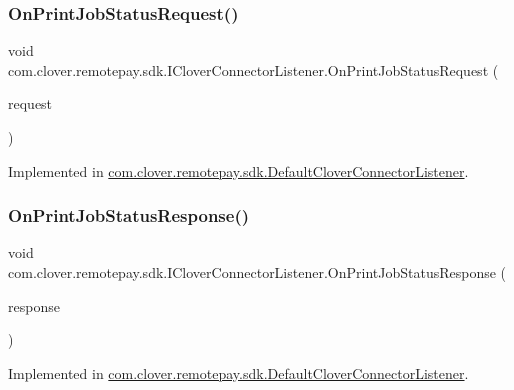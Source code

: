 \subsubsection{\texorpdfstring{On\+Print\+Job\+Status\+Request()}{OnPrintJobStatusRequest()}}
{\footnotesize\ttfamily void com.\+clover.\+remotepay.\+sdk.\+I\+Clover\+Connector\+Listener.\+On\+Print\+Job\+Status\+Request (\begin{DoxyParamCaption}\item[{\hyperlink{classcom_1_1clover_1_1remotepay_1_1sdk_1_1_print_job_status_request}{Print\+Job\+Status\+Request}}]{request }\end{DoxyParamCaption})}



Implemented in \hyperlink{classcom_1_1clover_1_1remotepay_1_1sdk_1_1_default_clover_connector_listener_a739a8523907057a33f0babacef2b1336}{com.\+clover.\+remotepay.\+sdk.\+Default\+Clover\+Connector\+Listener}.

\mbox{\label{interfacecom_1_1clover_1_1remotepay_1_1sdk_1_1_i_clover_connector_listener_a37d3d2607d2a424980bf22c59bedcf9b}} 
\subsubsection{\texorpdfstring{On\+Print\+Job\+Status\+Response()}{OnPrintJobStatusResponse()}}
{\footnotesize\ttfamily void com.\+clover.\+remotepay.\+sdk.\+I\+Clover\+Connector\+Listener.\+On\+Print\+Job\+Status\+Response (\begin{DoxyParamCaption}\item[{\hyperlink{classcom_1_1clover_1_1remotepay_1_1sdk_1_1_print_job_status_response}{Print\+Job\+Status\+Response}}]{response }\end{DoxyParamCaption})}



Implemented in \hyperlink{classcom_1_1clover_1_1remotepay_1_1sdk_1_1_default_clover_connector_listener_a8460fc8d168973b35b9306178b521ac0}{com.\+clover.\+remotepay.\+sdk.\+Default\+Clover\+Connector\+Listener}.

